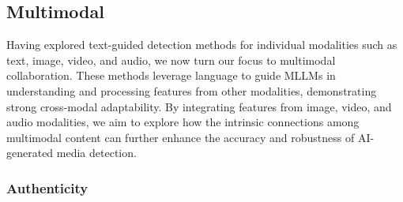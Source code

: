 \subsection{Multimodal}
Having explored text-guided detection methods for individual modalities such as text, image, video, and audio, we now turn our focus to multimodal collaboration. These methods leverage language to guide MLLMs in understanding and processing features from other modalities, demonstrating strong cross-modal adaptability. By integrating features from image, video, and audio modalities, we aim to explore how the intrinsic connections among multimodal content can further enhance the accuracy and robustness of AI-generated media detection.
\subsubsection{\textbf{Authenticity}}
